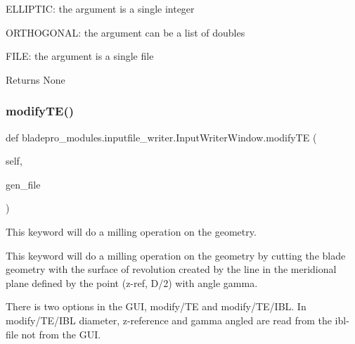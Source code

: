 \begin{DoxyItemize}
\item {\ttfamily E\+L\+L\+I\+P\+T\+IC\+:} the argument is a single integer \item {\ttfamily O\+R\+T\+H\+O\+G\+O\+N\+AL\+:} the argument can be a list of doubles \item {\ttfamily F\+I\+LE\+:} the argument is a single file\end{DoxyItemize}
\begin{DoxyReturn}{Returns}
None 
\end{DoxyReturn}
\hypertarget{classbladepro__modules_1_1inputfile__writer_1_1_input_writer_window_a52d4edd27f78b5559e6e3683c6adb3bc}{}\label{classbladepro__modules_1_1inputfile__writer_1_1_input_writer_window_a52d4edd27f78b5559e6e3683c6adb3bc} 
\subsubsection{\texorpdfstring{modify\+T\+E()}{modifyTE()}}
{\footnotesize\ttfamily def bladepro\+\_\+modules.\+inputfile\+\_\+writer.\+Input\+Writer\+Window.\+modify\+TE (\begin{DoxyParamCaption}\item[{}]{self,  }\item[{}]{gen\+\_\+file }\end{DoxyParamCaption})}



This keyword will do a milling operation on the geometry. 

This keyword will do a milling operation on the geometry by cutting the blade geometry with the surface of revolution created by the line in the meridional plane defined by the point (z-\/ref, D/2) with angle gamma.

There is two options in the G\+UI, modify/\+TE and modify/\+T\+E/\+I\+BL. In modify/\+T\+E/\+I\+BL diameter, z-\/reference and gamma angled are read from the ibl-\/file not from the G\+UI.


